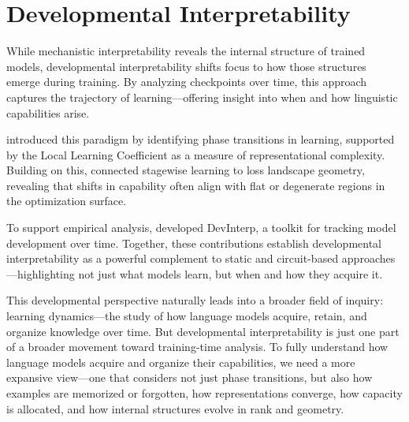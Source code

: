

\section{Developmental Interpretability}
While mechanistic interpretability reveals the internal structure of trained models, developmental interpretability shifts focus to how those structures emerge during training. By analyzing checkpoints over time, this approach captures the trajectory of learning—offering insight into when and how linguistic capabilities arise.

\citet{hoogland2023towards} introduced this paradigm by identifying phase transitions in learning, supported by the Local Learning Coefficient as a measure of representational complexity. Building on this, \citet{hoogland2025losslandscape} connected stagewise learning to loss landscape geometry, revealing that shifts in capability often align with flat or degenerate regions in the optimization surface.

To support empirical analysis, \citet{devinterpcode} developed DevInterp, a toolkit for tracking model development over time. Together, these contributions establish developmental interpretability as a powerful complement to static and circuit-based approaches—highlighting not just what models learn, but when and how they acquire it.

This developmental perspective naturally leads into a broader field of inquiry: learning dynamics—the study of how language models acquire, retain, and organize knowledge over time. But developmental interpretability is just one part of a broader movement toward training-time analysis. To fully understand how language models acquire and organize their capabilities, we need a more expansive view—one that considers not just phase transitions, but also how examples are memorized or forgotten, how representations converge, how capacity is allocated, and how internal structures evolve in rank and geometry.

